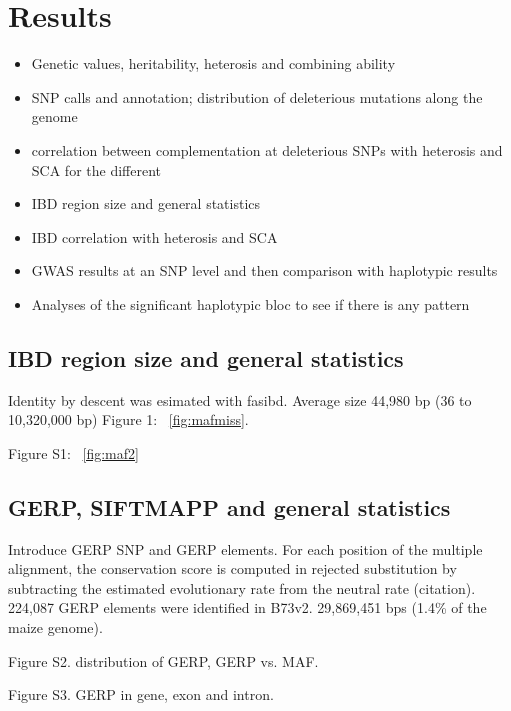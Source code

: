 \documentclass[10pt]{article}
\begin{document}
\section*{Results}

\begin{itemize}
  \item Genetic values, heritability, heterosis and combining ability 
  \item SNP calls and annotation; distribution of deleterious mutations along the genome 
  \item correlation between complementation at deleterious SNPs with heterosis and SCA for the different 
  \item IBD region size and general statistics 
  \item IBD correlation with heterosis and SCA
  \item GWAS results at an SNP level and then comparison with haplotypic results 
  \item Analyses of the significant haplotypic bloc to see if there is any pattern
\end{itemize}

\subsection*{IBD region size and general statistics}

Identity by descent was esimated with fasibd.
Average size 44,980 bp (36 to 10,320,000 bp)
Figure 1: ~\ref{fig:mafmiss}.


Figure S1: ~\ref{fig:maf2}

\subsection*{GERP, SIFTMAPP and general statistics}

Introduce GERP SNP and GERP elements. For each position of the multiple alignment, the conservation score is computed in rejected substitution by subtracting the estimated evolutionary rate from the neutral rate (citation).
224,087 GERP elements were identified in B73v2. 
29,869,451 bps (1.4\% of the maize genome).


Figure S2. distribution of GERP, GERP vs. MAF.



Figure S3. GERP in gene, exon and intron.
\end{document}
